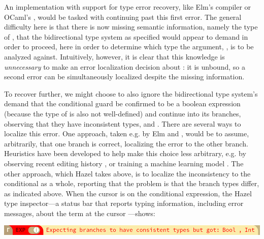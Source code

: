 An implementation with support for type error recovery, like Elm's compiler or OCaml's  \cite{bour2018merlin}, would 
 be tasked with continuing past this first error.
 The general difficulty here is that there is now missing semantic information, namely the type of , that 
 the bidirectional type system as specified 
 would appear to demand in order to proceed, here in order to determine which type the argument, , is to be analyzed against. 
 Intuitively, however, it is clear that this knowledge is \emph{unnecessary} to make an error localization decision about : 
it is unbound, so a second error can be simultaneously localized despite the missing information. 

To recover further, we might choose to also ignore the bidirectional type system's demand that the conditional guard be confirmed to be a boolean expression 
(because the type of  is also not well-defined) 
and continue into its branches, observing that they have inconsistent types,  and . 
There are several ways to localize this error. 
One approach, taken e.g. by Elm and , would be to assume, arbitrarily, that one branch is correct, localizing the error to the other branch. 
Heuristics have been developed to help make this choice less arbitrary, e.g. 
by observing recent editing history \cite{steady-typing}, 
or training a machine learning model \cite{SeidelBlame}. 
The other approach, which Hazel takes above, is to localize the inconsistency to the conditional as a whole, reporting that the problem is that the branch types differ, as indicated above. When the cursor is on the conditional expression, the Hazel type inspector---a status bar that reports typing information, including error messages, about the term at the cursor \cite{potter2020hazel}---shows:

\begin{center}
  \includegraphics[width=\textwidth]{images/haz3l-inconsistent-branches-cursor-inspector.png}
\end{center}

